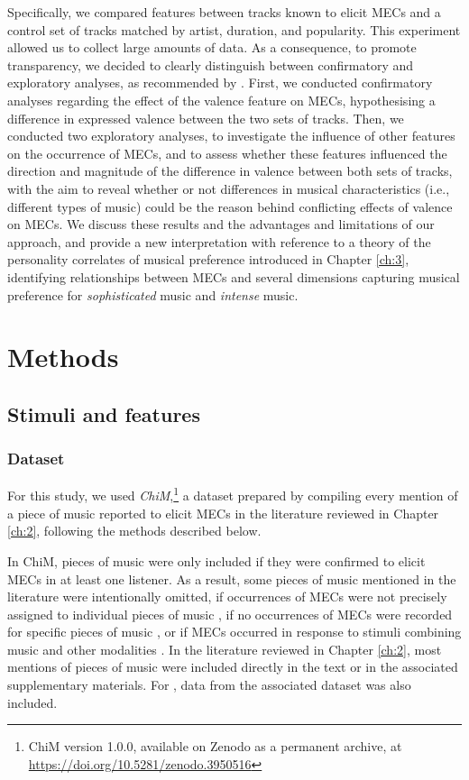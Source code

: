 Specifically, we compared features between tracks known to elicit MECs and a control set of tracks matched by artist, duration, and popularity. This experiment allowed us to collect large amounts of data. As a consequence, to promote transparency, we decided to clearly distinguish between confirmatory and exploratory analyses, as recommended by \textcite{dushoff2019}. First, we conducted confirmatory analyses regarding the effect of the valence feature on MECs, hypothesising a difference in expressed valence between the two sets of tracks. Then, we conducted two exploratory analyses, to investigate the influence of other features on the occurrence of MECs, and to assess whether these features influenced the direction and magnitude of the difference in valence between both sets of tracks, with the aim to reveal whether or not differences in musical characteristics (i.e., different types of music) could be the reason behind conflicting effects of valence on MECs. We discuss these results and the advantages and limitations of our approach, and provide a new interpretation with reference to a theory of the personality correlates of musical preference \parencite{rentfrow2011} introduced in Chapter \ref{ch:3}, identifying relationships between MECs and several dimensions capturing musical preference for \emph{sophisticated} music and \emph{intense} music.

\section{Methods}
\label{se:val-methods}

\subsection{Stimuli and features}

\subsubsection{Dataset}

For this study, we used \emph{ChiM},\footnote{ChiM version 1.0.0, available on Zenodo as a permanent archive, at \url{https://doi.org/10.5281/zenodo.3950516}} a dataset prepared by compiling every mention of a piece of music reported to elicit MECs in the literature reviewed in Chapter \ref{ch:2}, following the methods described below.

In ChiM, pieces of music were only included if they were confirmed to elicit MECs in at least one listener. As a result, some pieces of music mentioned in the literature were intentionally omitted, if occurrences of MECs were not precisely assigned to individual pieces of music \parencite[e.g.,][]{masherrero2014}, if no occurrences of MECs were recorded for specific pieces of music \parencite[e.g.,][]{grewe2007}, or if MECs occurred in response to stimuli combining music and other modalities \parencite[e.g.,][]{strick2015}. In the literature reviewed in Chapter \ref{ch:2}, most mentions of pieces of music were included directly in the text or in the associated supplementary materials. For \textcite{bannister2018}, data from the associated dataset \parencite{bannister2017} was also included.

